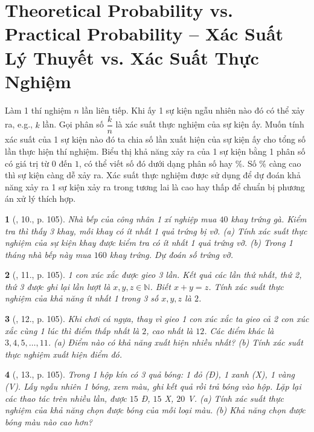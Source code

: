 \documentclass{article}
\newtheorem{baitoan}{}
\begin{document}

\section{Theoretical Probability vs. Practical Probability -- Xác Suất Lý Thuyết vs. Xác Suất Thực Nghiệm}
 Làm 1 thí nghiệm $n$ lần liên tiếp. Khi ấy 1 sự kiện ngẫu nhiên nào đó có thể xảy ra, e.g., $k$ lần. Gọi phân số $\dfrac{k}{n}$ là xác suất thực nghiệm của sự kiện ấy. Muốn tính xác suất của 1 sự kiện nào đó ta chia số lần xuất hiện của sự kiện ấy cho tổng số lần thực hiện thí nghiệm.  Biểu thị khả năng xảy ra của 1 sự kiện bằng 1 phân số có giá trị từ $0$ đến $1$, có thể viết số đó dưới dạng phân số hay $\%$. Số $\%$ càng cao thì sự kiện càng dễ xảy ra.  Xác suất thực nghiệm được sử dụng để dự đoán khả năng xảy ra 1 sự kiện xảy ra trong tương lai là cao hay thấp để chuẩn bị phương án xử lý thích hợp.

\begin{baitoan}[\cite{Tuyen_Toan_6}, 10., p. 105]
	Nhà bếp của công nhân 1 xí nghiệp mua $40$ khay trứng gà. Kiểm tra thì thấy 3 khay, mỗi khay có ít nhất 1 quả trứng bị vỡ. (a) Tính xác suất thực nghiệm của sự kiện khay được kiểm tra có ít nhất 1 quả trứng vỡ. (b) Trong 1 tháng nhà bếp này mua $160$ khay trứng. Dự đoán số trứng vỡ.
\end{baitoan}

\begin{baitoan}[\cite{Tuyen_Toan_6}, 11., p. 105]
	1 con xúc xắc được gieo 3 lần. Kết quả các lần thứ nhất, thứ 2, thứ 3 được ghi lại lần lượt là $x,y,z\in\mathbb{N}$. Biết $x + y = z$. Tính xác suất thực nghiệm của khả năng ít nhất 1 trong 3 số $x,y,z$ là $2$.
\end{baitoan}

\begin{baitoan}[\cite{Tuyen_Toan_6}, 12., p. 105]
	Khi chơi cá ngựa, thay vì gieo 1 con xúc xắc ta gieo cả 2 con xúc xắc cùng 1 lúc thì điểm thấp nhất là $2$, cao nhất là $12$. Các điểm khác là $3,4,5,\ldots,11$. (a) Điểm nào có khả năng xuất hiện nhiều nhất? (b) Tính xác suất thực nghiệm xuất hiện điểm đó.
\end{baitoan}

\begin{baitoan}[\cite{Tuyen_Toan_6}, 13., p. 105]
	Trong 1 hộp kín có 3 quả bóng: 1 đỏ (Đ), 1 xanh (X), 1 vàng (V). Lấy ngẫu nhiên 1 bóng, xem màu, ghi kết quả rồi trả bóng vào hộp. Lặp lại các thao tác trên nhiều lần, được $15$ Đ, $15$ X, $20$ V. (a) Tính xác suất thực nghiệm của khả năng chọn được bóng của mỗi loại màu. (b) Khả năng chọn được bóng màu nào cao hơn?
\end{baitoan}
\end{document}
